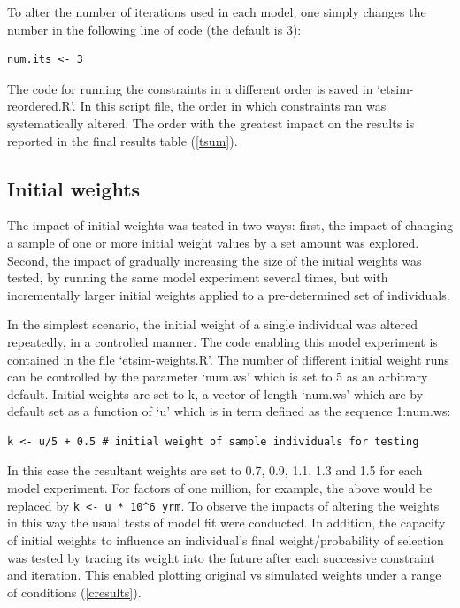 \documentclass[a4paper,10pt]{article}
\begin{document}
To alter the number of iterations used in each model, one simply
changes the number in the following line of code (the default is 3):

\begin{lstlisting}
num.its <- 3
\end{lstlisting}
 
The code for running the constraints in a different order
is saved in `etsim-reordered.R'.
In this script file, the order in which constraints ran was systematically altered.
The order with the greatest impact on the results is reported
in the final results table (\cref{tsum}).

\subsection{Initial weights}
The impact of initial weights was tested in two ways: first, the impact
of changing a sample of one or more initial weight values by a set
amount was explored. Second, the impact of gradually increasing the size of the initial 
weights was tested, by running the same model experiment several times, 
but with incrementally larger initial weights applied to a pre-determined set of individuals.

In the simplest scenario, the
initial weight of a single individual was altered 
repeatedly, in a controlled manner. The code enabling this model experiment 
is contained in the file `etsim-weights.R'. 
The number of different initial weight runs can be controlled by the 
parameter `num.ws' which is set to 5 as an arbitrary default.
Initial weights are set to k, a vector of length `num.ws' which
are by default set as a function of `u' which is in term
defined as the sequence 1:num.ws:

\begin{lstlisting}
k <- u/5 + 0.5 # initial weight of sample individuals for testing 
\end{lstlisting}

In this case the resultant weights are set to
 0.7, 0.9, 1.1, 1.3 and 1.5 for each model experiment. 
For factors of one million, for example, 
the above would be replaced by \lstinline !k <- u * 10^6 yrm!. 
To observe the impacts of altering the weights in this way
the usual tests of model fit were conducted. In addition,
the capacity of initial weights to influence an individual's 
final weight/probability of selection was tested by tracing its
weight into the future after each successive constraint and iteration. 
This enabled plotting original vs simulated weights under a 
range of conditions (\cref{cresults}).
\end{document}
